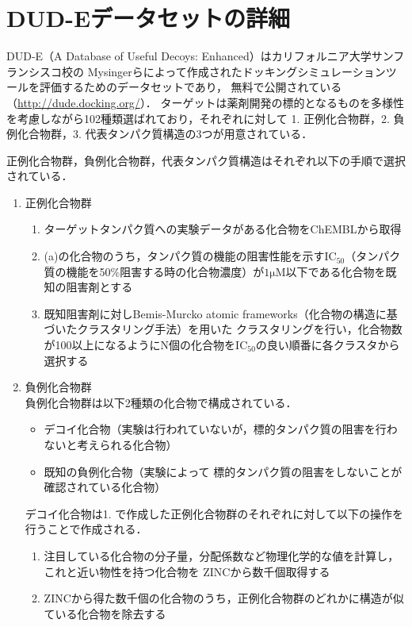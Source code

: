\appendix
\chapter{DUD-Eデータセットの詳細}\label{appendix:dude}
DUD-E（A Database of Useful Decoys: Enhanced）はカリフォルニア大学サンフランシスコ校の
Mysingerらによって作成されたドッキングシミュレーションツールを評価するためのデータセットであり\cite{Mysinger2012}，
無料で公開されている（\url{http://dude.docking.org/}）．
ターゲットは薬剤開発の標的となるものを多様性を考慮しながら102種類選ばれており，それぞれに対して
1. 正例化合物群，2. 負例化合物群，3. 代表タンパク質構造の3つが用意されている．

正例化合物群，負例化合物群，代表タンパク質構造はそれぞれ以下の手順で選択されている．
\begin{enumerate}
\item 正例化合物群
	\begin{enumerate}
	\item ターゲットタンパク質への実験データがある化合物をChEMBL\cite{Gaulton2012}から取得
	\item (a)の化合物のうち，タンパク質の機能の阻害性能を示す$\mathrm{IC_{50}}$（タンパク質の機能を50\%阻害する時の化合物濃度）が$\mathrm{1\mu M}$以下である化合物を既知の阻害剤とする
	\item 既知阻害剤に対しBemis-Murcko atomic frameworks（化合物の構造に基づいたクラスタリング手法\cite{Bemis1996}）を用いた
		クラスタリングを行い，化合物数が100以上になるようにN個の化合物を$\mathrm{IC_{50}}$の良い順番に各クラスタから選択する
	\end{enumerate}
\item 負例化合物群\\
	負例化合物群は以下2種類の化合物で構成されている．
	\begin{itemize}
	\item デコイ化合物（実験は行われていないが，標的タンパク質の阻害を行わないと考えられる化合物）
	\item 既知の負例化合物（実験によって	標的タンパク質の阻害をしないことが確認されている化合物）
	\end{itemize}
	デコイ化合物は1. で作成した正例化合物群のそれぞれに対して以下の操作を行うことで作成される．
	\begin{enumerate}
	\item 注目している化合物の分子量，分配係数など物理化学的な値を計算し，これと近い物性を持つ化合物を
		ZINC\cite{Irwin2005}から数千個取得する
	\item ZINCから得た数千個の化合物のうち，正例化合物群のどれかに構造が似ている化合物を除去する

\end{enumerate}
\end{enumerate}
